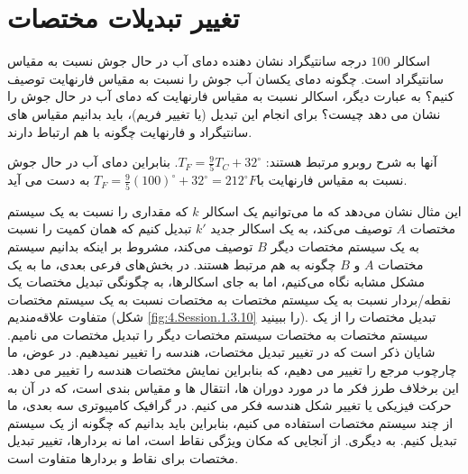 \section{\textbf{تغییر تبدیلات مختصات}}
\label{sec:3.4}
{
    \Large
    \begin{spacing}{1.5}
        اسکالر $100$ درجه سانتیگراد نشان دهنده دمای آب در حال جوش نسبت به مقیاس سانتیگراد است.
        چگونه دمای یکسان آب جوش را نسبت به مقیاس فارنهایت توصیف کنیم؟ به عبارت دیگر، اسکالر نسبت به مقیاس فارنهایت که دمای آب در حال جوش را نشان می دهد چیست؟ برای انجام این تبدیل (یا تغییر فریم)، ​​باید بدانیم مقیاس های سانتیگراد و فارنهایت چگونه با هم ارتباط دارند.

        آنها به شرح روبرو مرتبط هستند:
        $T_{F}=\frac{\displaystyle 9}{\displaystyle 5}T_{C}+32^\circ$. بنابراین دمای آب در حال جوش نسبت به مقیاس فارنهایت با$T_{F}=\frac{\displaystyle 9}{\displaystyle 5}(100)^\circ+32^\circ=212^\circ F$ به دست می آید.

        این مثال نشان می‌دهد که ما می‌توانیم یک اسکالر $k$ که مقداری را نسبت به یک سیستم مختصات $A$ توصیف می‌کند،
        به یک اسکالر جدید $k\prime$ تبدیل کنیم که همان کمیت را نسبت به یک سیستم مختصات دیگر $B$ توصیف می‌کند،
        مشروط بر اینکه بدانیم سیستم مختصات $A$ و  $B$ چگونه به هم مرتبط هستند.
        در بخش‌های فرعی بعدی، ما به یک مشکل مشابه نگاه می‌کنیم، اما به جای اسکالرها، به چگونگی تبدیل مختصات یک نقطه/بردار نسبت به یک سیستم مختصات به مختصات نسبت به یک سیستم مختصات متفاوت علاقه‌مندیم (شکل \ref{fig:4.Session.1.3.10} را ببینید).
        تبدیل مختصات را از یک سیستم مختصات به مختصات سیستم مختصات دیگر را تبدیل مختصات می نامیم.
        شایان ذکر است که در تغییر تبدیل مختصات، هندسه را تغییر نمیدهیم. در عوض، ما چارچوب مرجع را تغییر می دهیم، که بنابراین نمایش مختصات هندسه را تغییر می دهد.
        این برخلاف طرز فکر ما در مورد دوران ها، انتقال ها و مقیاس بندی است، که در آن به حرکت فیزیکی یا تغییر شکل هندسه فکر می کنیم.
        در گرافیک کامپیوتری سه بعدی، ما از چند سیستم مختصات استفاده می کنیم، بنابراین باید بدانیم که چگونه از یک سیستم تبدیل کنیم.
        به دیگری. از آنجایی که مکان ویژگی نقاط است، اما نه بردارها، تغییر تبدیل مختصات برای نقاط و بردارها متفاوت است.


\end{spacing}}
